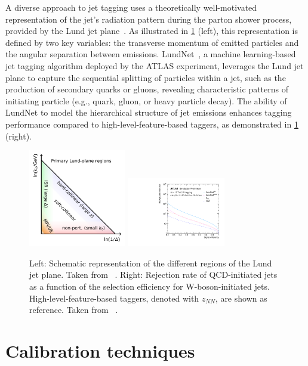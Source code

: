 \documentclass[a4paper,11pt]{article}
\begin{document}
A diverse approach to jet tagging uses a theoretically well-motivated representation of the jet's radiation pattern
during the parton shower process, provided by the Lund jet plane~\cite{Dreyer_2018}.
As illustrated in \cref{fig:LundPlane} (left), this representation is defined by two key variables:
the transverse momentum of emitted particles and the angular separation between emissions.
LundNet~\cite{Dreyer_2018}, a machine learning-based jet tagging algorithm deployed by the ATLAS experiment,
leverages the Lund jet plane to capture the sequential splitting of particles within a jet,
such as the production of secondary quarks or gluons, revealing characteristic patterns
of initiating particle (e.g., quark, gluon, or heavy particle decay).
The ability of LundNet to model the hierarchical structure of jet emissions
enhances tagging performance compared to high-level-feature-based taggers, as demonstrated in \cref{fig:LundPlane} (right).


\begin{figure}[t]
\centering
\includegraphics[width=0.38\textwidth]{figure_lund_jet_plane.pdf}
\includegraphics[width=0.38\textwidth]{figure_lundNet.pdf}
\caption{
Left: Schematic representation of the different regions of the Lund jet plane. Taken from ~\cite{Dreyer_2018}.
Right: Rejection rate of QCD-initiated jets as a function of the selection efficiency for W-boson-initiated jets.
High-level-feature-based taggers, denoted with $z_{NN}$, are shown as reference. Taken from ~\cite{ATL-PHYS-PUB-2023-017}.
}
\label{fig:LundPlane}
\end{figure}

\section{Calibration techniques}
\end{document}
